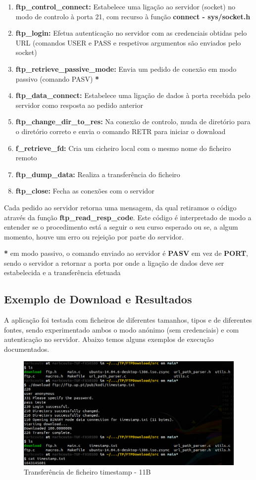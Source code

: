 \begin{enumerate}
    \item \textbf{ftp\_control\_connect:} Estabelece uma ligação ao servidor (socket) no modo de controlo à porta 21, com recurso à função \textbf{connect - sys/socket.h}
    \item \textbf{ftp\_login:} Efetua autenticação no servidor com as credenciais obtidas pelo URL (comandos USER e PASS e respetivos argumentos são enviados pelo socket)
    \item \textbf{ftp\_retrieve\_passive\_mode:} Envia um pedido de conexão em modo passivo (comando PASV) \textbf{*}
    \item \textbf{ftp\_data\_connect:} Estabelece uma ligação de dados à porta recebida pelo servidor como resposta ao pedido anterior 
    \item \textbf{ftp\_change\_dir\_to\_res:} Na conexão de controlo, muda de diretório para o diretório correto e envia o comando RETR para iniciar o download
    \item \textbf{f\_retrieve\_fd:} Cria um cicheiro local com o mesmo nome do ficheiro remoto
    \item \textbf{ftp\_dump\_data:} Realiza a transferência do ficheiro
    \item \textbf{ftp\_close:} Fecha as conexões com o servidor
\end{enumerate}

Cada pedido ao servidor retorna uma mensagem, da qual retiramos o código através da função \textbf{ftp\_read\_resp\_code}. Este código é interpretado de modo a entender se o procedimento está a seguir o seu curso esperado ou se, a algum momento, houve um erro ou rejeição por parte do servidor.

\textbf{*} em modo passivo, o comando enviado ao servidor é \textbf{PASV} em vez de \textbf{PORT}, sendo o servidor a retornar a porta por onde a ligação de dados deve ser estabelecida e a transferência efetuada

\subsection{Exemplo de Download e Resultados}

A aplicação foi testada com ficheiros de diferentes tamanhos, tipos e de diferentes fontes, sendo experimentado ambos o modo anónimo (sem credenciais) e com autenticação no servidor. Abaixo temos alguns exemplos de execução documentados.

\begin{figure}[!h]
\centering
  \includegraphics[width=.6\linewidth]{img/Download1.png}
  \caption{Transferência de ficheiro timestamp - 11B}
\end{figure}

